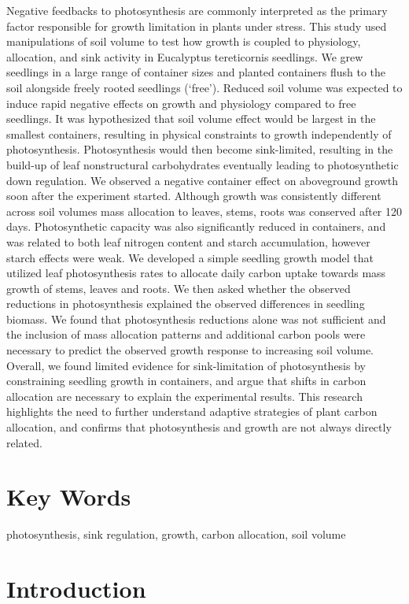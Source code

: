 \documentclass[a4paper]{article}\usepackage[]{graphicx}\usepackage[]{color}
\begin{document}
Negative feedbacks to photosynthesis are commonly interpreted as the primary factor responsible for growth limitation in plants under stress.  This study used manipulations of soil volume to test how growth is coupled to physiology, allocation, and sink activity in Eucalyptus tereticornis seedlings. We grew seedlings in a large range of container sizes and planted containers flush to the soil alongside freely rooted seedlings (‘free’). Reduced soil volume was expected to induce rapid negative effects on growth and physiology compared to free seedlings. It was hypothesized that soil volume effect would be largest in the smallest containers, resulting in physical constraints to growth independently of photosynthesis. Photosynthesis would then become sink-limited, resulting in the build-up of leaf nonstructural carbohydrates eventually leading to photosynthetic down regulation. We observed a negative container effect on aboveground growth soon after the experiment started. Although growth was consistently different across soil volumes mass allocation to leaves, stems, roots was conserved after 120 days. Photosynthetic capacity was also significantly reduced in containers, and was related to both leaf nitrogen content and starch accumulation, however starch effects were weak. We developed a simple seedling growth model that utilized leaf photosynthesis rates to allocate daily carbon uptake towards mass growth of stems, leaves and roots. We then asked whether the observed reductions in photosynthesis explained the observed differences in seedling biomass.  We found that photosynthesis reductions alone was not sufficient and the inclusion of mass allocation patterns and additional carbon pools were necessary to predict the observed growth response to increasing soil volume. Overall, we found limited evidence for sink-limitation of photosynthesis by constraining seedling growth in containers, and argue that shifts in carbon allocation are necessary to explain the experimental results. This research highlights the need to further understand adaptive strategies of plant carbon allocation, and confirms that photosynthesis and growth are not always directly related.

\section*{Key Words}

photosynthesis, sink regulation, growth, carbon allocation, soil volume


\section*{Introduction}
\end{document}
